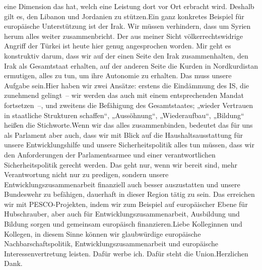 \documentclass{article}
\begin{document}
eine Dimension das hat, welch eine Leistung dort vor Ort erbracht wird. Deshalb gilt es, den Libanon und Jordanien zu stützen.Ein ganz konkretes Beispiel für europäische Unterstützung ist der Irak. Wir müssen verhindern, dass um Syrien herum alles weiter zusammenbricht. Der aus meiner Sicht völkerrechtswidrige Angriff der Türkei ist heute hier genug angesprochen worden. Mir geht es konstruktiv darum, dass wir auf der einen Seite den Irak zusammenhalten, den Irak als Gesamtstaat erhalten, auf der anderen Seite die Kurden in Nordkurdistan ermutigen, alles zu tun, um ihre Autonomie zu erhalten. Das muss unsere Aufgabe sein.Hier haben wir zwei Ansätze: erstens die Eindämmung des IS, die zunehmend gelingt – wir werden das auch mit einem entsprechenden Mandat fortsetzen –, und zweitens die Befähigung des Gesamtstaates; „wieder Vertrauen in staatliche Strukturen schaffen“, „Aussöhnung“, „Wiederaufbau“, „Bildung“ heißen die Stichworte.Wenn wir das alles zusammenbinden, bedeutet das für uns als Parlament aber auch, dass wir mit Blick auf die Haushaltsausstattung für unsere Entwicklungshilfe und unsere Sicherheitspolitik alles tun müssen, dass wir den Anforderungen der Parlamentsarmee und einer verantwortlichen Sicherheitspolitik gerecht werden. Das geht nur, wenn wir bereit sind, mehr Verantwortung nicht nur zu predigen, sondern unsere Entwicklungszusammenarbeit finanziell auch besser auszustatten und unsere Bundeswehr zu befähigen, dauerhaft in dieser Region tätig zu sein. Das erreichen wir mit PESCO-Projekten, indem wir zum Beispiel auf europäischer Ebene für Hubschrauber, aber auch für Entwicklungszusammenarbeit, Ausbildung und Bildung sorgen und gemeinsam europäisch finanzieren.Liebe Kolleginnen und Kollegen, in diesem Sinne können wir glaubwürdige europäische Nachbarschaftspolitik, Entwicklungszusammenarbeit und europäische Interessenvertretung leisten. Dafür werbe ich. Dafür steht die Union.Herzlichen Dank.
\end{document}
